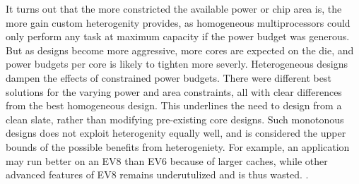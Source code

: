 
It turns out that the more constricted the available power or chip area is, the more gain custom heterogenity provides, as homogeneous multiprocessors could only perform any task at maximum capacity if the power budget was generous.
But as designs become more aggressive, more cores are expected on the die, and power budgets per core is likely to tighten more severly.
Heterogeneous designs dampen the effects of constrained power budgets. 
There were different best solutions for the varying power and area constraints, all with clear differences from the best homogeneous design.
This underlines the need to design from a clean slate, rather than modifying pre-existing core designs.
Such monotonous designs does not exploit heterogenity equally well, and is considered the upper bounds of the possible benefits from heterogeniety.
For example, an application may run better on an EV8 than EV6 because of larger caches, while other advanced features of EV8 remains underutulized and is thus wasted.
\cite{heterogeneous-arch}.


